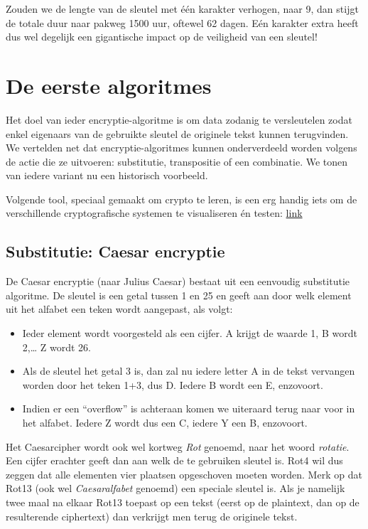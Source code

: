 \documentclass[
  10pt,
  dutch,
  paper=a4,
  ,captions=tableheading
]{scrbook}
\providecommand{\tightlist}{%
  \setlength{\itemsep}{0pt}\setlength{\parskip}{0pt}}
\begin{document}
Zouden we de lengte van de sleutel met één karakter verhogen, naar 9,
dan stijgt de totale duur naar pakweg 1500 uur, oftewel 62 dagen. Eén
karakter extra heeft dus wel degelijk een gigantische impact op de
veiligheid van een sleutel!

\section{De eerste algoritmes}\label{de-eerste-algoritmes}

Het doel van ieder encryptie-algoritme is om data zodanig te
versleutelen zodat enkel eigenaars van de gebruikte sleutel de originele
tekst kunnen terugvinden. We vertelden net dat encryptie-algoritmes
kunnen onderverdeeld worden volgens de actie die ze uitvoeren:
substitutie, transpositie of een combinatie. We tonen van iedere variant
nu een historisch voorbeeld.

\begin{tipblock}
Volgende tool, speciaal gemaakt om crypto te leren, is een erg handig
iets om de verschillende cryptografische systemen te visualiseren én
testen: \href{HTTPS://www.cryptool.org/en/ct2/}{link}
\end{tipblock}

\subsection{Substitutie: Caesar
encryptie}\label{substitutie-caesar-encryptie}

De Caesar encryptie (naar Julius Caesar) bestaat uit een eenvoudig
substitutie algoritme. De sleutel is een getal tussen 1 en 25 en geeft
aan door welk element uit het alfabet een teken wordt aangepast, als
volgt:

\begin{itemize}
\tightlist
\item
  Ieder element wordt voorgesteld als een cijfer. A krijgt de waarde 1,
  B wordt 2,\ldots{} Z wordt 26.
\item
  Als de sleutel het getal 3 is, dan zal nu iedere letter A in de tekst
  vervangen worden door het teken 1+3, dus D. Iedere B wordt een E,
  enzovoort.
\item
  Indien er een ``overflow'' is achteraan komen we uiteraard terug naar
  voor in het alfabet. Iedere Z wordt dus een C, iedere Y een B,
  enzovoort.
\end{itemize}

Het Caesarcipher wordt ook wel kortweg \emph{Rot} genoemd, naar het
woord \emph{rotatie}. Een cijfer erachter geeft dan aan welk de te
gebruiken sleutel is. Rot4 wil dus zeggen dat alle elementen vier
plaatsen opgeschoven moeten worden. Merk op dat Rot13 (ook wel
\emph{Caesaralfabet} genoemd) een speciale sleutel is. Als je namelijk
twee maal na elkaar Rot13 toepast op een tekst (eerst op de plaintext,
dan op de resulterende ciphertext) dan verkrijgt men terug de originele
tekst.
\end{document}
